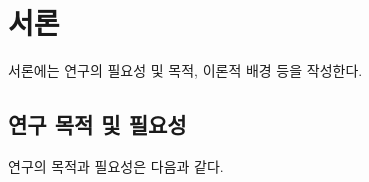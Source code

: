 \section{서론}
서론에는 연구의 필요성 및 목적, 이론적 배경 등을 작성한다.

\subsection{연구 목적 및 필요성}
연구의 목적과 필요성은 다음과 같다\cite{True2000}.
